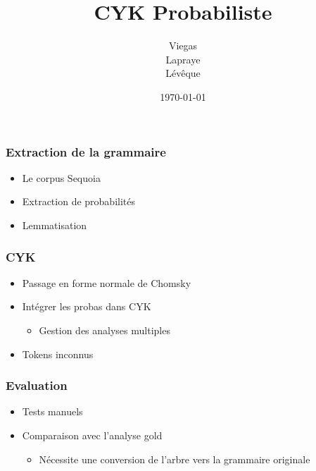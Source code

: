 \documentclass{beamer}
\begin{document}
\title{CYK Probabiliste}  %
\author{Viegas\\Lapraye\\Lévêque}

\date{\today}


\begin{frame}
 \maketitle
\end{frame}




\begin{frame}
\frametitle{Extraction de la grammaire}

\begin{itemize}
 \item<1-3> Le corpus Sequoia
 \item<2-3> Extraction de probabilités
 \item<3-3> Lemmatisation
\end{itemize}

 
\end{frame}

\begin{frame}
 \frametitle{CYK}
 \begin{itemize}
  \item<1-3>{Passage en forme normale de Chomsky}
  \item<2-3>{Intégrer les probas dans CYK}
  \begin{itemize}
   \item<2-3>{Gestion des analyses multiples}
  \end{itemize}
  \item<3>{Tokens inconnus}
 
 \end{itemize}

 
\end{frame}

\begin{frame}
\frametitle{Evaluation}
 \begin{itemize}
  
  \item<1-3>{Tests manuels}
  
  \item<2-3>{Comparaison avec l'analyse gold}
  \begin{itemize}
   \item{Nécessite une conversion de l'arbre vers la grammaire originale}
  \end{itemize}

 \end{itemize}

\end{frame}
\end{document}
